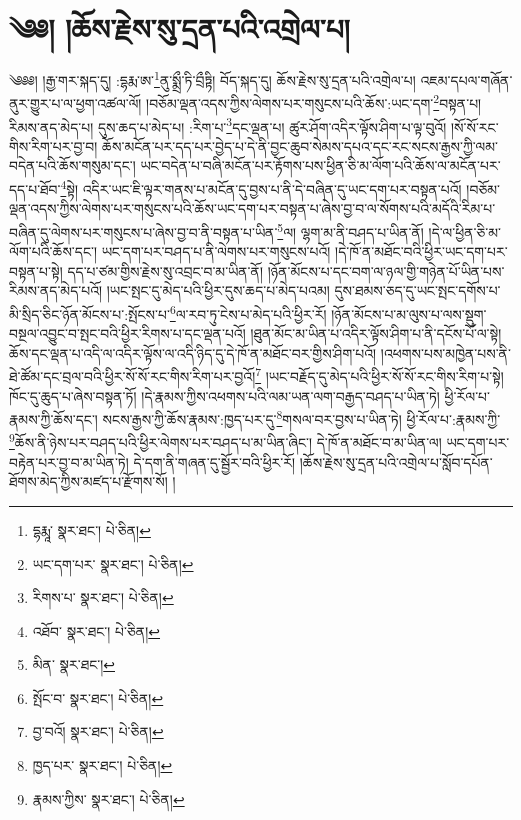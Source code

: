\setcounter{footnote}{0} 
\chapter{༄༅། །ཆོས་རྗེས་སུ་དྲན་པའི་འགྲེལ་པ།}༄༅༅། །རྒྱ་གར་སྐད་དུ། :དྷརྨ་ཨ་\footnote{དྷརྨཱ་  སྣར་ཐང་།  པེ་ཅིན། }ནུ་སྨྲྀ་ཏི་བྲྀཏྟི། བོད་སྐད་དུ། ཆོས་རྗེས་སུ་དྲན་པའི་འགྲེལ་པ། འཇམ་དཔལ་གཞོན་ནུར་གྱུར་པ་ལ་ཕྱག་འཚལ་ལོ། །བཅོམ་ལྡན་འདས་ཀྱིས་ལེགས་པར་གསུངས་པའི་ཆོས་:ཡང་དག་\footnote{ཡང་དག་པར་  སྣར་ཐང་།  པེ་ཅིན། }བསྟན་པ། རིམས་ནད་མེད་པ། དུས་ཆད་པ་མེད་པ། :རིག་པ་\footnote{རིགས་པ་  སྣར་ཐང་།  པེ་ཅིན། }དང་ལྡན་པ། ཚུར་ཤོག་འདིར་ལྟོས་ཤིག་པ་ལྟ་བུའོ། །སོ་སོ་རང་གིས་རིག་པར་བྱ་བ། ཆོས་མངོན་པར་དད་པར་བྱེད་པ་དེ་ནི་བྱང་ཆུབ་སེམས་དཔའ་དང་རང་སངས་རྒྱས་ཀྱི་ལམ་བདེན་པའི་ཆོས་གསུམ་དང་། ཡང་བདེན་པ་བཞི་མངོན་པར་རྟོགས་པས་ཕྱིན་ཅི་མ་ལོག་པའི་ཆོས་ལ་མངོན་པར་དད་པ་ཐོབ་\footnote{འཐོབ་  སྣར་ཐང་།  པེ་ཅིན། }སྟེ། འདིར་ཡང་ཇི་ལྟར་གནས་པ་མངོན་དུ་བྱས་པ་ནི་དེ་བཞིན་དུ་ཡང་དག་པར་བསྟན་པའོ། །བཅོམ་ལྡན་འདས་ཀྱིས་ལེགས་པར་གསུངས་པའི་ཆོས་ཡང་དག་པར་བསྟན་པ་ཞེས་བྱ་བ་ལ་སོགས་པའི་མདོའི་རིམ་པ་བཞིན་དུ་ལེགས་པར་གསུངས་པ་ཞེས་བྱ་བ་ནི་བསྟན་པ་ཡིན་\footnote{མིན་  སྣར་ཐང་། }ལ། ལྷག་མ་ནི་བཤད་པ་ཡིན་ནོ། །དེ་ལ་ཕྱིན་ཅི་མ་ལོག་པའི་ཆོས་དང་། ཡང་དག་པར་བཤད་པ་ནི་ལེགས་པར་གསུངས་པའོ། །དེ་ཁོ་ན་མཐོང་བའི་ཕྱིར་ཡང་དག་པར་བསྟན་པ་སྟེ། དད་པ་ཙམ་གྱིས་རྗེས་སུ་འབྲང་བ་མ་ཡིན་ནོ། །ཉོན་མོངས་པ་དང་བག་ལ་ཉལ་གྱི་གཉེན་པོ་ཡིན་པས་རིམས་ནད་མེད་པའོ། །ཡང་སྤང་དུ་མེད་པའི་ཕྱིར་དུས་ཆད་པ་མེད་པའམ། དུས་ཐམས་ཅད་དུ་ཡང་སྤང་དགོས་པ་མི་སྲིད་ཅིང་ཉོན་མོངས་པ་:སྤོངས་པ་\footnote{སྤོང་བ་  སྣར་ཐང་།  པེ་ཅིན། }ལ་རབ་ཏུ་ངེས་པ་མེད་པའི་ཕྱིར་རོ། །ཉོན་མོངས་པ་མ་ལུས་པ་ལས་སྡུག་བསྔལ་འབྱུང་བ་སྤང་བའི་ཕྱིར་རིགས་པ་དང་ལྡན་པའོ། །ཐུན་མོང་མ་ཡིན་པ་འདིར་ལྟོས་ཤིག་པ་ནི་དངོས་པོ་ལ་སྟེ། ཆོས་དང་ལྡན་པ་འདི་ལ་འདིར་ལྟོས་ལ་འདི་ཉིད་དུ་དེ་ཁོ་ན་མཐོང་བར་གྱིས་ཤིག་པའོ། །འཕགས་པས་མཁྱེན་པས་ནི་ཐེ་ཚོམ་དང་བྲལ་བའི་ཕྱིར་སོ་སོ་རང་གིས་རིག་པར་བྱའོ།\footnote{བྱ་བའོ།  སྣར་ཐང་།  པེ་ཅིན། } །ཡང་བརྗོད་དུ་མེད་པའི་ཕྱིར་སོ་སོ་རང་གིས་རིག་པ་སྟེ། ཁོང་དུ་ཆུད་པ་ཞེས་བསྟན་ཏོ། །དེ་རྣམས་ཀྱིས་འཕགས་པའི་ལམ་ཡན་ལག་བརྒྱད་བཤད་པ་ཡིན་ཏེ། ཕྱི་རོལ་པ་རྣམས་ཀྱི་ཆོས་དང་། སངས་རྒྱས་ཀྱི་ཆོས་རྣམས་:ཁྱད་པར་དུ་\footnote{ཁྱད་པར་  སྣར་ཐང་།  པེ་ཅིན། }གསལ་བར་བྱས་པ་ཡིན་ཏེ། ཕྱི་རོལ་པ་:རྣམས་ཀྱི་\footnote{རྣམས་ཀྱིས་  སྣར་ཐང་།  པེ་ཅིན། }ཆོས་ནི་ཉེས་པར་བཤད་པའི་ཕྱིར་ལེགས་པར་བཤད་པ་མ་ཡིན་ཞིང་། དེ་ཁོ་ན་མཐོང་བ་མ་ཡིན་ལ། ཡང་དག་པར་བརྟེན་པར་བྱ་བ་མ་ཡིན་ཏེ། དེ་དག་ནི་གཞན་དུ་སྦྱོར་བའི་ཕྱིར་རོ། །ཆོས་རྗེས་སུ་དྲན་པའི་འགྲེལ་པ་སློབ་དཔོན་ཐོགས་མེད་ཀྱིས་མཛད་པ་རྫོགས་སོ། ། 
